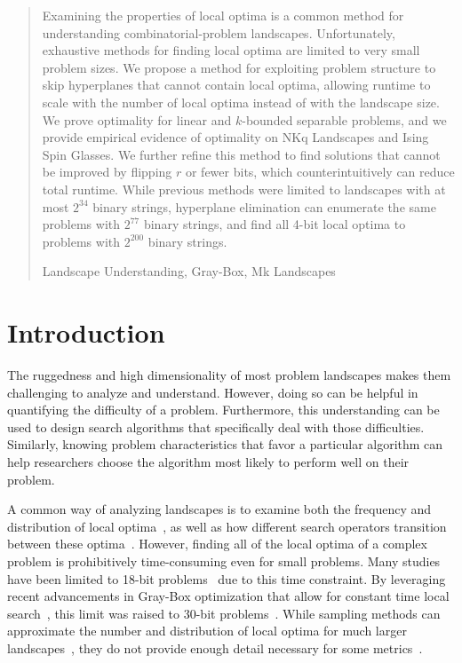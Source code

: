 \documentclass[runningheads,a4paper]{llncs}
\newcommand{\keywords}[1]{\par\addvspace\baselineskip
\noindent\keywordname\enspace\ignorespaces#1}
\begin{document}
\begin{abstract}
Examining the properties of local optima is a common method for understanding
combinatorial-problem landscapes.
Unfortunately,
exhaustive methods for finding local optima are limited to very small problem sizes.
We propose a method for exploiting problem structure
to skip hyperplanes
that cannot contain local optima, allowing runtime to scale with
the number of local optima instead of with the landscape size.
We prove optimality for linear and $k$-bounded separable problems, and we provide
empirical evidence of optimality on NKq Landscapes and Ising Spin Glasses.
We further refine this method to find solutions
that cannot be improved by flipping $r$ or fewer bits, which counterintuitively
can reduce total runtime. While previous methods were limited to
landscapes with at most $2^{34}$ binary strings, hyperplane elimination can enumerate the same problems with
$2^{77}$ binary strings, and find all 4-bit local optima to problems with $2^{200}$ binary strings.



\keywords{Landscape Understanding, Gray-Box, Mk Landscapes}
\end{abstract}


\section{Introduction}
The ruggedness and high dimensionality of most problem landscapes makes them challenging to
analyze and understand. However, doing so can be helpful in
quantifying the difficulty of a problem. Furthermore,
this understanding can be used to design search algorithms that specifically deal
with those difficulties. 
Similarly, knowing problem characteristics that favor
a particular
algorithm can help researchers choose the algorithm
most likely to perform well on their problem.

A common way of analyzing landscapes is to
examine both the frequency and distribution of local optima~\cite{boese:1994:bigvalley},
as well as how different search operators transition between these
optima~\cite{tomassini:2008:nknetworks,verel:2011:nknetworks,ochoa:2015:crossovernetworks}.
However, finding all of the local optima of a complex problem is prohibitively time-consuming
even for small problems. Many studies have been limited to 18-bit
problems~\cite{tomassini:2008:nknetworks,verel:2011:nknetworks} due to this time constraint.
By leveraging recent advancements in Gray-Box optimization that allow for
constant time local search~\cite{chicano:2014:ball}, this limit was raised
to 30-bit problems~\cite{ochoa:2015:crossovernetworks}. While sampling
methods can approximate the number and distribution of local optima for much larger
landscapes~\cite{iclanzan:2014:somnetworks}, they do not provide enough
detail necessary for some metrics~\cite{ochoa:2015:crossovernetworks}.
\end{document}
